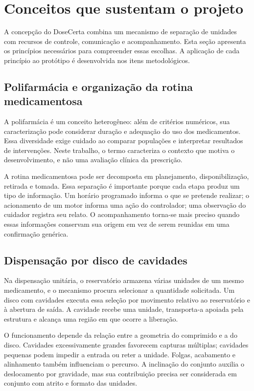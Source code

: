 \section{Conceitos que sustentam o projeto}\label{sec:conceitos}
A concepção do DoseCerta combina um mecanismo de separação de unidades com recursos de controle, comunicação e acompanhamento. Esta seção apresenta os princípios necessários para compreender essas escolhas. A aplicação de cada princípio ao protótipo é desenvolvida nos itens metodológicos.

\subsection{Polifarmácia e organização da rotina medicamentosa}
A polifarmácia é um conceito heterogêneo: além de critérios numéricos, sua caracterização pode considerar duração e adequação do uso dos medicamentos. Essa diversidade exige cuidado ao comparar populações e interpretar resultados de intervenções. Neste trabalho, o termo caracteriza o contexto que motiva o desenvolvimento, e não uma avaliação clínica da prescrição. \cite{MASNOON2017}

A rotina medicamentosa pode ser decomposta em planejamento, disponibilização, retirada e tomada. Essa separação é importante porque cada etapa produz um tipo de informação. Um horário programado informa o que se pretende realizar; o acionamento de um motor informa uma ação do controlador; uma observação do cuidador registra seu relato. O acompanhamento torna-se mais preciso quando essas informações conservam sua origem em vez de serem reunidas em uma confirmação genérica.

\subsection{Dispensação por disco de cavidades}
Na dispensação unitária, o reservatório armazena várias unidades de um mesmo medicamento, e o mecanismo procura selecionar a quantidade solicitada. Um disco com cavidades executa essa seleção por movimento relativo ao reservatório e à abertura de saída. A cavidade recebe uma unidade, transporta-a apoiada pela estrutura e alcança uma região em que ocorre a liberação.

O funcionamento depende da relação entre a geometria do comprimido e a do disco. Cavidades excessivamente grandes favorecem capturas múltiplas; cavidades pequenas podem impedir a entrada ou reter a unidade. Folgas, acabamento e alinhamento também influenciam o percurso. A inclinação do conjunto auxilia o deslocamento por gravidade, mas sua contribuição precisa ser considerada em conjunto com atrito e formato das unidades.

